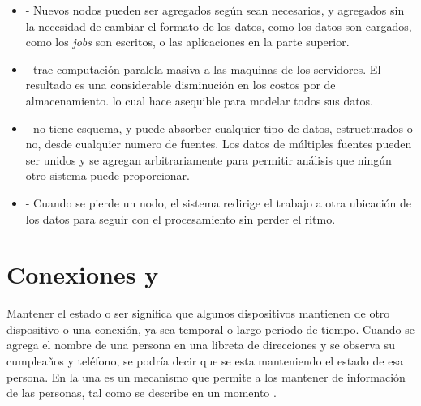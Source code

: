 \begin{itemize}
	\item \textbf{\scalableQA}- Nuevos nodos pueden ser agregados según sean necesarios, y agregados sin la necesidad de cambiar el formato de los datos, como los datos son cargados, como los \textit{jobs} son escritos, o las aplicaciones en la parte superior.
	
	\item \textbf{\costEffectiveCPT}- \hadoopNAME trae computación paralela masiva a las maquinas de los servidores. El resultado es una considerable disminución en los costos por \terabytePC de almacenamiento. lo cual hace asequible para modelar todos sus datos.
	
	\item \textbf{\flexibleQA}- \hadoopNAME no tiene esquema, y puede absorber cualquier tipo de datos, estructurados o no, desde cualquier numero de fuentes. Los datos de múltiples fuentes pueden ser unidos y se agregan arbitrariamente para permitir análisis que ningún otro sistema puede proporcionar.
	
	\item \textbf{\faultTolerantQA}- Cuando se pierde un nodo, el sistema redirige el trabajo a otra ubicación de los datos para seguir con el procesamiento sin perder el ritmo.
\end{itemize}

\chapter{Conexiones \statefulINT y \statelessINT }\label{ap:apendice_connection_statful_stateless}

Mantener el estado o ser \statefulINT significa que algunos dispositivos mantienen \trackCPT de otro dispositivo o una conexión, ya sea temporal o largo periodo de tiempo. Cuando se agrega el nombre de una persona en una libreta de direcciones y se observa su cumpleaños y teléfono, se podría decir que se esta manteniendo el estado de esa persona. En la \webINT una \cookieINT es un mecanismo \statefulINT que permite a los \webserverINT mantener \trackCPT de información de las personas, tal como se describe en un momento \cite{online_connection_stateful_stateless}.


